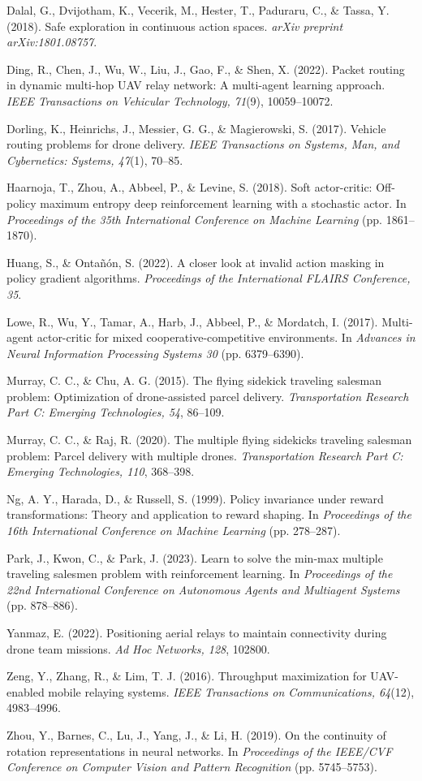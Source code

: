 \documentclass[12pt]{article}
\begin{document}
\noindent Dalal, G., Dvijotham, K., Vecerik, M., Hester, T., Paduraru, C., \& Tassa, Y. (2018).
Safe exploration in continuous action spaces. \textit{arXiv preprint arXiv:1801.08757}.

\noindent Ding, R., Chen, J., Wu, W., Liu, J., Gao, F., \& Shen, X. (2022). Packet routing in
dynamic multi-hop UAV relay network: A multi-agent learning approach. \textit{IEEE Transactions on
Vehicular Technology, 71}(9), 10059--10072.

\noindent Dorling, K., Heinrichs, J., Messier, G. G., \& Magierowski, S. (2017). Vehicle routing
problems for drone delivery. \textit{IEEE Transactions on Systems, Man, and Cybernetics: Systems,
47}(1), 70--85.

\noindent Haarnoja, T., Zhou, A., Abbeel, P., \& Levine, S. (2018). Soft actor-critic: Off-policy
maximum entropy deep reinforcement learning with a stochastic actor. In \textit{Proceedings of the
35th International Conference on Machine Learning} (pp. 1861--1870).

\noindent Huang, S., \& Ontañón, S. (2022). A closer look at invalid action masking in policy
gradient algorithms. \textit{Proceedings of the International FLAIRS Conference, 35}.

\noindent Lowe, R., Wu, Y., Tamar, A., Harb, J., Abbeel, P., \& Mordatch, I. (2017). Multi-agent
actor-critic for mixed cooperative-competitive environments. In \textit{Advances in Neural
Information Processing Systems 30} (pp. 6379--6390).

\noindent Murray, C. C., \& Chu, A. G. (2015). The flying sidekick traveling salesman problem:
Optimization of drone-assisted parcel delivery. \textit{Transportation Research Part C: Emerging
Technologies, 54}, 86--109.

\noindent Murray, C. C., \& Raj, R. (2020). The multiple flying sidekicks traveling salesman
problem: Parcel delivery with multiple drones. \textit{Transportation Research Part C: Emerging
Technologies, 110}, 368--398.

\noindent Ng, A. Y., Harada, D., \& Russell, S. (1999). Policy invariance under reward
transformations: Theory and application to reward shaping. In \textit{Proceedings of the 16th
International Conference on Machine Learning} (pp. 278--287).

\noindent Park, J., Kwon, C., \& Park, J. (2023). Learn to solve the min-max multiple traveling
salesmen problem with reinforcement learning. In \textit{Proceedings of the 22nd International
Conference on Autonomous Agents and Multiagent Systems} (pp. 878--886).

\noindent Yanmaz, E. (2022). Positioning aerial relays to maintain connectivity during drone team
missions. \textit{Ad Hoc Networks, 128}, 102800.

\noindent Zeng, Y., Zhang, R., \& Lim, T. J. (2016). Throughput maximization for UAV-enabled mobile
relaying systems. \textit{IEEE Transactions on Communications, 64}(12), 4983--4996.

\noindent Zhou, Y., Barnes, C., Lu, J., Yang, J., \& Li, H. (2019). On the continuity of rotation
representations in neural networks. In \textit{Proceedings of the IEEE/CVF Conference on Computer
Vision and Pattern Recognition} (pp. 5745--5753).
\end{document}
